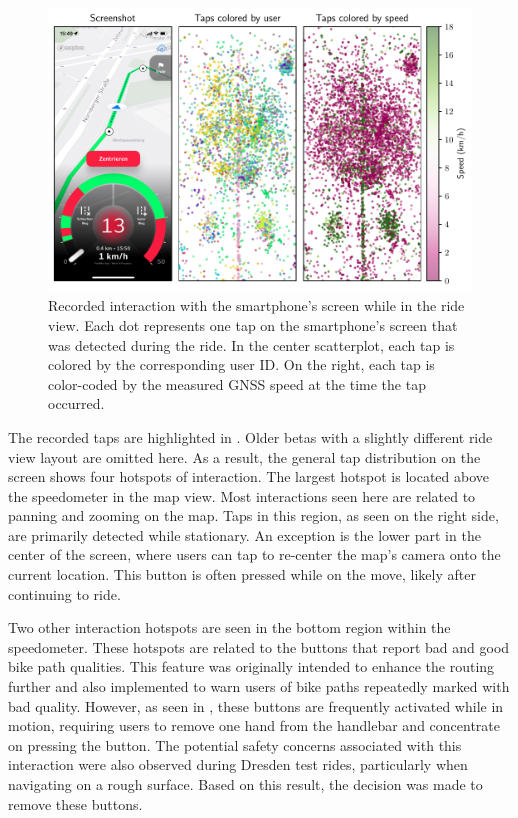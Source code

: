 \begin{figure}[t]
\caption{Recorded interaction with the smartphone's screen while in the ride view. Each dot represents one tap on the smartphone's screen that was detected during the ride. In the center scatterplot, each tap is colored by the corresponding user ID. On the right, each tap is color-coded by the measured GNSS speed at the time the tap occurred.}\label{fig:app-user-interaction}
\includegraphics[width=\linewidth]{images/app-user-interaction.pdf}
\end{figure}

The recorded taps are highlighted in . Older betas with a slightly different ride view layout are omitted here. As a result, the general tap distribution on the screen shows four hotspots of interaction. The largest hotspot is located above the speedometer in the map view. Most interactions seen here are related to panning and zooming on the map. Taps in this region, as seen on the right side, are primarily detected while stationary. An exception is the lower part in the center of the screen, where users can tap to re-center the map's camera onto the current location. This button is often pressed while on the move, likely after continuing to ride.

Two other interaction hotspots are seen in the bottom region within the speedometer. These hotspots are related to the buttons that report bad and good bike path qualities. This feature was originally intended to enhance the routing further and also implemented to warn users of bike paths repeatedly marked with bad quality. However, as seen in , these buttons are frequently activated while in motion, requiring users to remove one hand from the handlebar and concentrate on pressing the button. The potential safety concerns associated with this interaction were also observed during Dresden test rides, particularly when navigating on a rough surface. Based on this result, the decision was made to remove these buttons.

